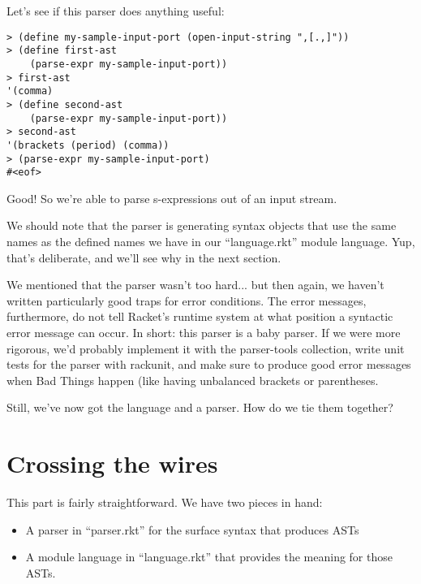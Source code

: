 \documentclass{article}
\begin{document}
Let's see if this parser does anything useful:
\begin{verbatim}
> (define my-sample-input-port (open-input-string ",[.,]"))
> (define first-ast
    (parse-expr my-sample-input-port))
> first-ast
'(comma)
> (define second-ast
    (parse-expr my-sample-input-port))
> second-ast
'(brackets (period) (comma))
> (parse-expr my-sample-input-port)
#<eof>
\end{verbatim}
Good! So we're able to parse s-expressions out of an input stream.

We should note that the parser is generating syntax objects that use
the same names as the defined names we have in our ``language.rkt''
module language. Yup, that's deliberate, and we'll see why in the next
section.


We mentioned that the parser wasn't too hard... but then again, we
haven't written particularly good traps for error conditions.  The
error messages, furthermore, do not tell Racket's runtime system at
what position a syntactic error message can occur.  In short: this
parser is a baby parser. If we were more rigorous, we'd probably
implement it with the parser-tools collection, write unit tests for
the parser with rackunit, and make sure to produce good error messages
when Bad Things happen (like having unbalanced brackets or
parentheses.

Still, we've now got the language and a parser. How do we tie them together?

\section{Crossing the wires}
This part is fairly straightforward. We have two pieces in hand:

\begin{itemize}
\item A parser in ``parser.rkt'' for the surface syntax that produces ASTs

\item A module language in ``language.rkt'' that provides the meaning for those ASTs.
\end{itemize}
\end{document}
